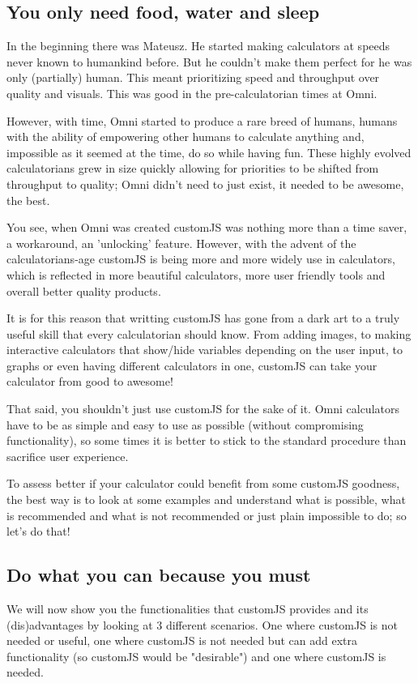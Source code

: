 \subsection{You only need food, water and sleep}
\label{sub:need}
In the beginning there was Mateusz. He started making calculators at speeds never known to humankind before. But he couldn't make them perfect for he was only (partially) human. This meant prioritizing speed and throughput over quality and visuals. This was good in the pre-calculatorian times at Omni.

However, with time, Omni started to produce a rare breed of humans, humans with the ability of empowering other humans to calculate anything and, impossible as it seemed at the time, do so while having fun. These highly evolved calculatorians grew in size quickly allowing for priorities to be shifted from throughput to quality; Omni didn't need to just exist, it needed to be awesome, the best.

You see, when Omni was created customJS was nothing more than a time saver, a workaround, an 'unlocking' feature. However, with the advent of the calculatorians-age customJS is being more and more widely use in calculators, which is reflected in more beautiful calculators, more user friendly tools and overall better quality products. 

It is for this reason that writting customJS has gone from a dark art to a truly useful skill that every calculatorian should know. From adding images, to making interactive calculators that show/hide variables depending on the user input, to graphs or even having different calculators in one, customJS can take your calculator from good to awesome!

That said, you shouldn't just use customJS for the sake of it. Omni calculators have to be as simple and easy to use as possible (without compromising functionality), so some times it is better to stick to the standard procedure than sacrifice user experience. 

To assess better if your calculator could benefit from some customJS goodness, the best way is to look at some examples and understand what is possible, what is recommended and what is not recommended or just plain impossible to do; so let's do that!

\subsection{Do what you can because you must}
\label{sub:whenToCJS}
We will now show you the functionalities that customJS provides and its (dis)advantages by looking at 3 different scenarios. One where customJS is not needed or useful, one where customJS is not needed but can add extra functionality (so customJS would be "desirable") and one where customJS is needed.

